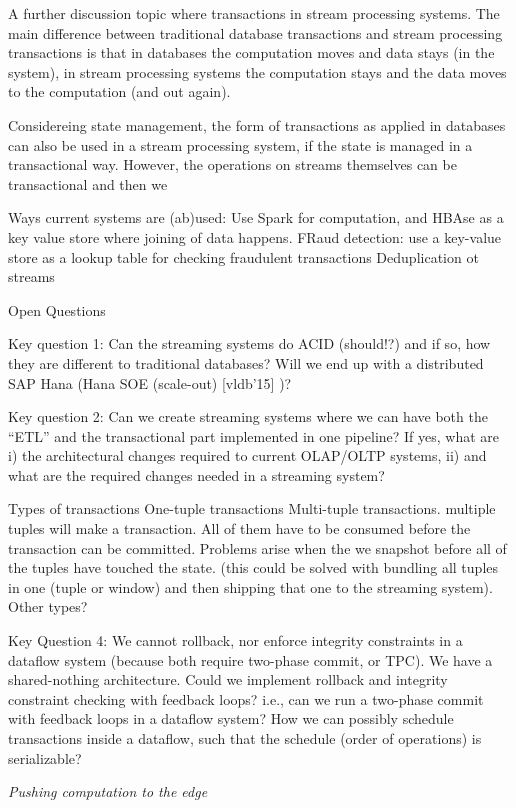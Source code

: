 A further discussion topic where transactions in stream processing systems. 
The main difference between traditional database transactions and stream 
processing transactions is that in databases the computation moves and 
data stays (in the system), in stream processing systems the computation stays
and the data moves to the computation (and out again). 

Considereing state management, the form of transactions as applied in databases
can also be used in a stream processing system, if the state is managed in a
transactional way. However, the operations on streams themselves can be 
transactional and then we


Ways current systems are (ab)used:
Use Spark for computation, and HBAse as a key value store where joining of data happens.
FRaud detection: use a key-value store as a lookup table for checking fraudulent transactions
Deduplication ot streams

Open Questions

Key question 1: Can the streaming systems do ACID (should!?) and if so, how they are different to traditional databases? Will we end up with a distributed SAP Hana (Hana SOE (scale-out) [vldb’15] )?

Key question 2: Can we create streaming systems where we can have both the “ETL” and the transactional part implemented in one pipeline? If yes, what are i) the architectural changes required to current OLAP/OLTP systems, ii) and what are the required changes needed in a streaming system?


Types of transactions
One-tuple transactions
Multi-tuple transactions. multiple tuples will make a transaction. All of them have to be consumed before the transaction can be committed. Problems arise when the we snapshot before all of the tuples have touched the state. (this could be solved with bundling all tuples in one (tuple or window) and then shipping that one to the streaming system).
Other types?


Key Question 4: We cannot rollback, nor enforce integrity constraints in a dataflow system (because both require two-phase commit, or TPC). We have a shared-nothing architecture. Could we implement rollback and integrity constraint checking with feedback loops? i.e., can we run a two-phase commit with feedback loops in a dataflow system? How we can possibly schedule transactions inside a dataflow, such that the schedule (order of operations) is serializable?

\emph{Pushing computation to the edge}

